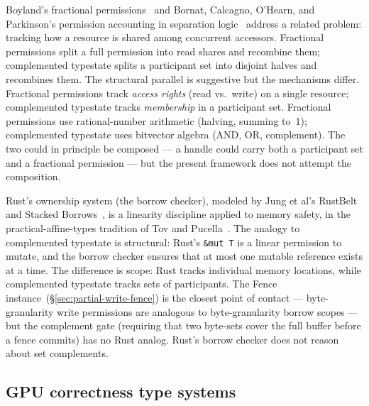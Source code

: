\documentclass[acmsmall,screen,review,anonymous,nonacm]{acmart}
\begin{document}
Boyland's fractional permissions~\cite{boyland:sas:2003} and Bornat, Calcagno, O'Hearn, and Parkinson's permission accounting in separation logic~\cite{bornat:popl:2005} address a related problem: tracking how a resource is shared among concurrent accessors. Fractional permissions split a full permission into read shares and recombine them; complemented typestate splits a participant set into disjoint halves and recombines them. The structural parallel is suggestive but the mechanisms differ. Fractional permissions track \emph{access rights} (read vs.\ write) on a single resource; complemented typestate tracks \emph{membership} in a participant set. Fractional permissions use rational-number arithmetic (halving, summing to~1); complemented typestate uses bitvector algebra (AND, OR, complement). The two could in principle be composed --- a handle could carry both a participant set and a fractional permission --- but the present framework does not attempt the composition.

Rust's ownership system (the borrow checker), modeled by Jung et al's RustBelt~\cite{jung:popl:2018} and Stacked Borrows~\cite{jung:popl:2020}, is a linearity discipline applied to memory safety, in the practical-affine-types tradition of Tov and Pucella~\cite{tov:popl:2011}. The analogy to complemented typestate is structural: Rust's \texttt{\&mut T} is a linear permission to mutate, and the borrow checker ensures that at most one mutable reference exists at a time. The difference is scope: Rust tracks individual memory locations, while complemented typestate tracks sets of participants. The Fence instance~(\S\ref{sec:partial-write-fence}) is the closest point of contact --- byte-granularity write permissions are analogous to byte-granularity borrow scopes --- but the complement gate (requiring that two byte-sets cover the full buffer before a fence commits) has no Rust analog. Rust's borrow checker does not reason about set complements.

\subsection{GPU correctness type systems}\label{sec:gpu-correctness}
\end{document}
